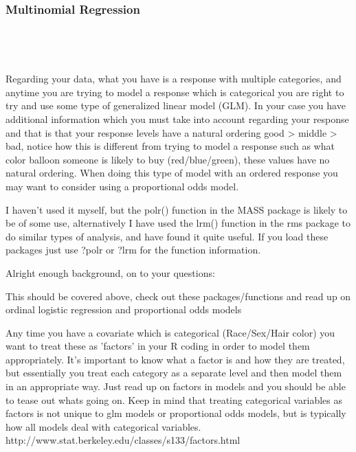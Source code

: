 \documentclass[00-GLMregslides.tex]{subfiles}
\begin{document}
	
	\begin{frame}[fragile]
		\frametitle{Multinomial Regression}
		
		\begin{verbatim}
		
		
		
		\end{verbatim}	
	\end{frame}
\begin{frame}
Regarding your data, what you have is a response with multiple categories, and anytime you are trying to model a response which is categorical you are right to try and use some type of generalized linear model (GLM). In your case you have additional information which you must take into account regarding your response and that is that your response levels have a natural ordering good > middle > bad, notice how this is different from trying to model a response such as what color balloon someone is likely to buy (red/blue/green), these values have no natural ordering. When doing this type of model with an ordered response you may want to consider using a proportional odds model.

\end{frame}
\begin{frame}
I haven't used it myself, but the polr() function in the MASS package is likely to be of some use, alternatively I have used the lrm() function in the rms package to do similar types of analysis, and have found it quite useful. If you load these packages just use ?polr or ?lrm for the function information.
\end{frame}
\begin{frame}
Alright enough background, on to your questions:


This should be covered above, check out these packages/functions and read up on ordinal logistic regression and proportional odds models

Any time you have a covariate which is categorical (Race/Sex/Hair color) you want to treat these as 'factors' in your R coding in order to model them appropriately. It's important to know what a factor is and how they are treated, but essentially you treat each category as a separate level and then model them in an appropriate way. Just read up on factors in models and you should be able to tease out whats going on. Keep in mind that treating categorical variables as factors is not unique to glm models or proportional odds models, but is typically how all models deal with categorical variables. http://www.stat.berkeley.edu/classes/s133/factors.html
\end{frame}
\end{document}
